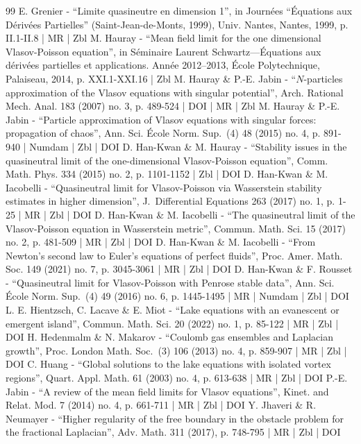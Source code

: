 \begin{thebibliography}{99}
E. Grenier - “Limite quasineutre en dimension 1”, in Journées “Équations aux Dérivées Partielles” (Saint-Jean-de-Monts, 1999), Univ. Nantes, Nantes, 1999, p. II.1-II.8 | MR | Zbl
M. Hauray - “Mean field limit for the one dimensional Vlasov-Poisson equation”, in Séminaire Laurent Schwartz—Équations aux dérivées partielles et applications. Année 2012–2013, École Polytechnique, Palaiseau, 2014, p. XXI.1-XXI.16 | Zbl
M. Hauray \& P.-E. Jabin - “$N$-particles approximation of the Vlasov equations with singular potential”, Arch. Rational Mech. Anal. 183 (2007) no. 3, p. 489-524 | DOI | MR | Zbl
M. Hauray \& P.-E. Jabin - “Particle approximation of Vlasov equations with singular forces: propagation of chaos”, Ann. Sci. École Norm. Sup. (4) 48 (2015) no. 4, p. 891-940 | Numdam | Zbl | DOI
D. Han-Kwan \& M. Hauray - “Stability issues in the quasineutral limit of the one-dimensional Vlasov-Poisson equation”, Comm. Math. Phys. 334 (2015) no. 2, p. 1101-1152 | Zbl | DOI
D. Han-Kwan \& M. Iacobelli - “Quasineutral limit for Vlasov-Poisson via Wasserstein stability estimates in higher dimension”, J. Differential Equations 263 (2017) no. 1, p. 1-25 | MR | Zbl | DOI
D. Han-Kwan \& M. Iacobelli - “The quasineutral limit of the Vlasov-Poisson equation in Wasserstein metric”, Commun. Math. Sci. 15 (2017) no. 2, p. 481-509 | MR | Zbl | DOI
D. Han-Kwan \& M. Iacobelli - “From Newton’s second law to Euler’s equations of perfect fluids”, Proc. Amer. Math. Soc. 149 (2021) no. 7, p. 3045-3061 | MR | Zbl | DOI
D. Han-Kwan \& F. Rousset - “Quasineutral limit for Vlasov-Poisson with Penrose stable data”, Ann. Sci. École Norm. Sup. (4) 49 (2016) no. 6, p. 1445-1495 | MR | Numdam | Zbl | DOI
L. E. Hientzsch, C. Lacave \& E. Miot - “Lake equations with an evanescent or emergent island”, Commun. Math. Sci. 20 (2022) no. 1, p. 85-122 | MR | Zbl | DOI
H. Hedenmalm \& N. Makarov - “Coulomb gas ensembles and Laplacian growth”, Proc. London Math. Soc. (3) 106 (2013) no. 4, p. 859-907 | MR | Zbl | DOI
C. Huang - “Global solutions to the lake equations with isolated vortex regions”, Quart. Appl. Math. 61 (2003) no. 4, p. 613-638 | MR | Zbl | DOI
P.-E. Jabin - “A review of the mean field limits for Vlasov equations”, Kinet. and Relat. Mod. 7 (2014) no. 4, p. 661-711 | MR | Zbl | DOI
Y. Jhaveri \& R. Neumayer - “Higher regularity of the free boundary in the obstacle problem for the fractional Laplacian”, Adv. Math. 311 (2017), p. 748-795 | MR | Zbl | DOI

\end{thebibliography}
